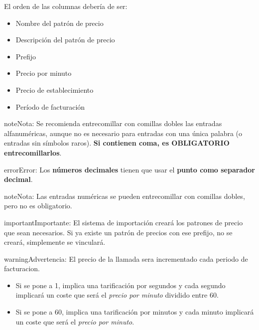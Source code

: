 \documentclass[letterpaper,10pt,spanish]{sphinxmanual}
\begin{document}
\noindent{}

El orden de las columnas debería de ser:
\begin{itemize}
\item {} 
Nombre del patrón de precio

\item {} 
Descripción del patrón de precio

\item {} 
Prefijo

\item {} 
Precio por minuto

\item {} 
Precio de establecimiento

\item {} 
Período de facturación

\end{itemize}

\begin{notice}{note}{Nota:}
Se recomienda entrecomillar con comillas dobles las entradas alfanuméricas, aunque no es necesario para entradas con una única palabra (o entradas sin símbolos raros). \textbf{Si contienen coma, es OBLIGATORIO entrecomillarlos}.
\end{notice}

\begin{notice}{error}{Error:}
Los \textbf{números decimales} tienen que usar el \textbf{punto como separador decimal}.
\end{notice}

\begin{notice}{note}{Nota:}
Las entradas numéricas se pueden entrecomillar con comillas dobles, pero no es obligatorio.
\end{notice}

\begin{notice}{important}{Importante:}
El sistema de importación creará los patrones de precio que sean necesarios. Si ya existe un patrón de precios con ese prefijo, no se creará, simplemente se vinculará.
\end{notice}

\begin{notice}{warning}{Advertencia:}
El precio de la llamada sera incrementado cada periodo de facturacion.
\begin{itemize}
\item {} 
Si se pone a 1, implica una tarificación por segundos y cada segundo implicará un coste que será el \emph{precio por minuto} dividido entre 60.

\item {} 
Si se pone a 60, implica una tarificación por minutos y cada minuto implicará un coste que será el \emph{precio por minuto}.

\end{itemize}
\end{notice}
\end{document}
